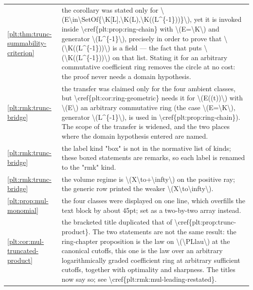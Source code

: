 \documentclass[11pt,oneside]{article}
\theoremstyle{plain}
\theoremstyle{definition}
\theoremstyle{remark}
\begin{document}
\begin{longtable}{@{}p{} p{}@{}}
\cref{plt:thm:trunc-summability-criterion} & the corollary was stated only for \textbackslash (E\textbackslash in\textbackslash SetOf\{\textbackslash K[L],\textbackslash K(L),\textbackslash K((L\textasciicircum \{-1\}))\}\textbackslash ), yet it is invoked inside \textbackslash cref\{plt:prop:ring-chain\} with \textbackslash (E=\textbackslash K\textbackslash ) and generator \textbackslash (L\textasciicircum \{-1\}\textbackslash ), precisely in order to prove that \textbackslash (\textbackslash K((L\textasciicircum \{-1\}))\textbackslash ) is a field --- the fact that puts \textbackslash (\textbackslash K((L\textasciicircum \{-1\}))\textbackslash ) on that list. Stating it for an arbitrary commutative coefficient ring removes the circle at no cost: the proof never needs a domain hypothesis.\\
\cref{plt:rmk:trunc-bridge} & the transfer was claimed only for the four ambient classes, but \textbackslash cref\{plt:cor:ring-geometric\} needs it for \textbackslash (E((t))\textbackslash ) with \textbackslash (E\textbackslash ) an arbitrary commutative ring (the case \textbackslash (E=\textbackslash K\textbackslash ), generator \textbackslash (L\textasciicircum \{-1\}\textbackslash ), is used in \textbackslash cref\{plt:prop:ring-chain\}). The scope of the transfer is widened, and the two places where the domain hypothesis entered are named.\\
\cref{plt:rmk:trunc-bridge} & the label kind "box" is not in the normative list of kinds; these boxed statements are remarks, so each label is renamed to the "rmk" kind.\\
\cref{plt:rmk:trunc-bridge} & the volume regime is \textbackslash (X\textbackslash to+\textbackslash infty\textbackslash ) on the positive ray; the generic row printed the weaker \textbackslash (X\textbackslash to\textbackslash infty\textbackslash ).\\
\cref{plt:prop:mul-monomial} & the four classes were displayed on one line, which overfills the text block by about 45pt; set as a two-by-two array instead.\\
\cref{plt:cor:mul-truncated-product} & the bracketed title duplicated that of \textbackslash cref\{plt:prop:trunc-product\}. The two statements are not the same result: the ring-chapter proposition is the law on \textbackslash (\textbackslash PLlau\textbackslash ) at the canonical cutoffs, this one is the law over an arbitrary logarithmically graded coefficient ring at arbitrary sufficient cutoffs, together with optimality and sharpness. The titles now say so; see \textbackslash cref\{plt:rmk:mul-leading-restated\}.\\

\end{longtable}
\end{document}
